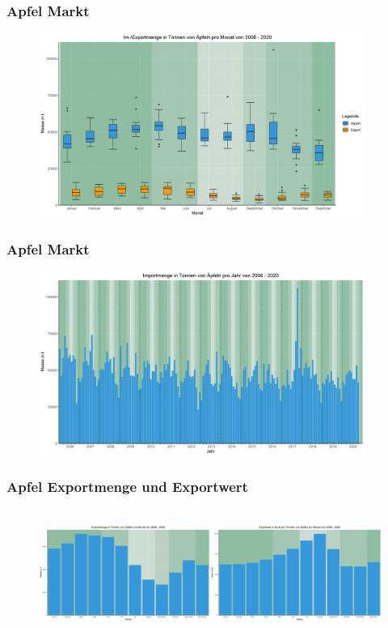 \documentclass{beamer}
\begin{document}
\begin{frame}
\frametitle{Apfel Markt}
  \begin{figure}[h]
    \centering
    \includegraphics[height=6cm]{0_apfel_markt}
  \end{figure}
\end{frame}

\begin{frame}
\frametitle{Apfel Markt}
  \begin{figure}[h]
    \centering
    \includegraphics[height=6cm]{0_apfel_import}
  \end{figure}
\end{frame}

\begin{frame}
\frametitle{Apfel Exportmenge und Exportwert}
  \begin{figure}[h]
    \hbox{\hspace{-1cm}
    \includegraphics[width=12.5cm]{1_apfel_gegenlaeufig0}
    }
  \end{figure}
\end{frame}
\end{document}
